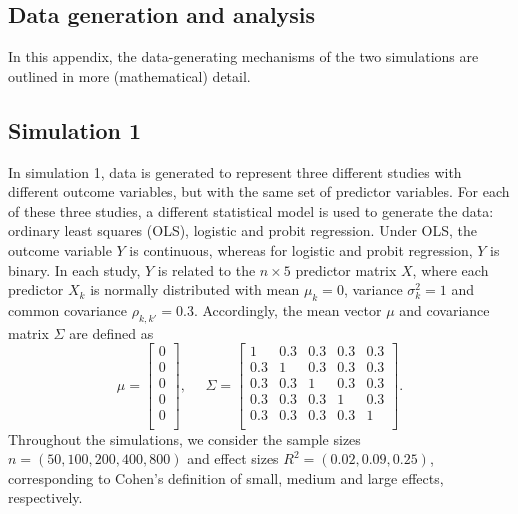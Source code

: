 \documentclass[11pt,reqno]{article}
\begin{document}
\printbibliography

\begin{appendices}
\section{Data generation and analysis} \label{appendix:gendat}

In this appendix, the data-generating mechanisms of the two simulations are outlined in more (mathematical) detail.

\subsection{Simulation 1}

In simulation 1, data is generated to represent three different studies with different outcome variables, but with the same set of predictor variables.
For each of these three studies, a different statistical model is used to generate the data: ordinary least squares (OLS), logistic and probit regression.
Under OLS, the outcome variable $Y$ is continuous, whereas for logistic and probit regression, $Y$ is binary.
In each study, $Y$ is related to the $n \times 5$ predictor matrix $X$, where each predictor $X_k$
is normally distributed with mean $\mu_k = 0$, variance $\sigma_k^2 = 1$ and common covariance $\rho_{k, k'} = 0.3$.
Accordingly, the mean vector $\mu$ and covariance matrix $\Sigma$ are defined as
\begin{equation}
\mu = \begin{bmatrix} 0 \\ 0 \\ 0 \\ 0 \\ 0 \\ \end{bmatrix}, ~~~~~~
\Sigma = \begin{bmatrix}
1 & 0.3 & 0.3 & 0.3 & 0.3 \\
0.3 & 1 & 0.3 & 0.3 & 0.3 \\
0.3 & 0.3 & 1 & 0.3 & 0.3 \\
0.3 & 0.3 & 0.3 & 1 & 0.3 \\
0.3 & 0.3 & 0.3 & 0.3 & 1 \\
\end{bmatrix}.
\end{equation}
Throughout the simulations, we consider the sample sizes $n = (50, 100, 200, 400, 800)$ and effect sizes $R^2 = (0.02, 0.09, 0.25)$, corresponding to Cohen's \autocite*{cohen_1988} definition of small, medium and large effects, respectively.

\end{appendices}
\end{document}
